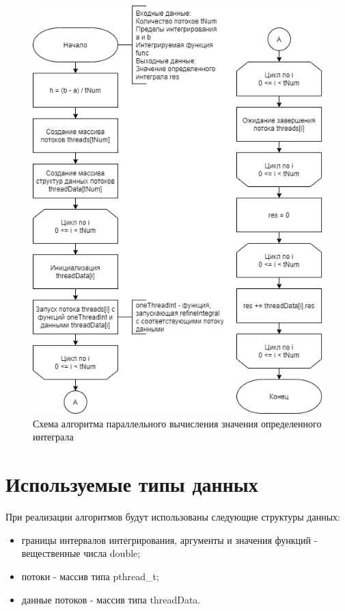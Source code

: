 \newpage 
\begin{figure}[h!]
	\begin{center}
		\includegraphics[scale=0.7]{assets/integralThreads.png}
	\end{center}
	\caption{Схема алгоритма параллельного вычисления значения определенного интеграла}
\end{figure}

\newpage
\section{Используемые типы данных}

При реализации алгоритмов будут использованы следующие структуры данных:
\begin{itemize}
	\item границы интервалов интегрирования, аргументы и значения функций - вещественные числа double;
	\item потоки - массив типа pthread\_t;
	\item данные потоков - массив типа threadData. 
\end{itemize}

